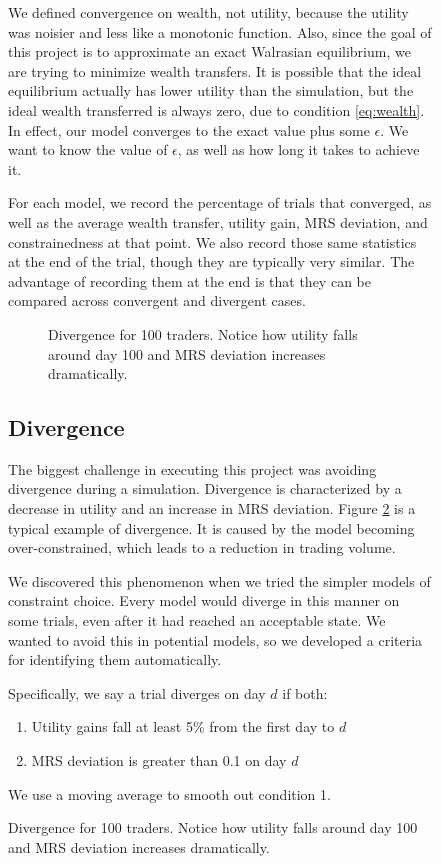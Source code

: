 \documentclass[12pt,a4paper,titlepage]{article}
\begin{document}
\begin{figure}[H]
We defined convergence on wealth, not utility, because the utility was noisier and less like a monotonic function.
Also, since the goal of this project is to approximate an exact Walrasian equilibrium, we are trying to minimize wealth transfers.
It is possible that the ideal equilibrium actually has lower utility than the simulation, but the ideal wealth transferred is always zero, due to condition \ref{eq:wealth}.
In effect, our model converges to the exact value plus some $\epsilon$.
We want to know the value of $\epsilon$, as well as how long it takes to achieve it.

For each model, we record the percentage of trials that converged, as well as the average wealth transfer, utility gain, MRS deviation, and constrainedness at that point.
We also record those same statistics at the end of the trial, though they are typically very similar.
The advantage of recording them at the end is that they can be compared across convergent and divergent cases.

\begin{figure}[H]
    \centering
    
    \caption{
      Divergence for 100 traders.
      Notice how utility falls around day 100 and MRS deviation increases dramatically.
    }
    \label{fig:div}
\end{figure}

\subsection{Divergence}
The biggest challenge in executing this project was avoiding divergence during a simulation.
Divergence is characterized by a decrease in utility and an increase in MRS deviation.
Figure \ref{fig:div} is a typical example of divergence. 
It is caused by the model becoming over-constrained, which leads to a reduction in trading volume.

We discovered this phenomenon when we tried the simpler models of constraint choice.
Every model would diverge in this manner on some trials, even after it had reached an acceptable state.
We wanted to avoid this in potential models, so we developed a criteria for identifying them automatically.

Specifically, we say a trial diverges on day $d$ if both:
\begin{enumerate}
  \item Utility gains fall at least 5\% from the first day to $d$ 
  \item MRS deviation is greater than 0.1 on day $d$
\end{enumerate}
We use a moving average to smooth out condition 1.
    

\end{figure}
\end{document}

